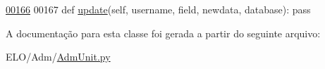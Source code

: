 \begin{DoxyCode}
\hypertarget{classAdm_1_1AdmUnit_1_1IfPersAdm_l00166}{}\hyperlink{classAdm_1_1AdmUnit_1_1IfPersAdm_aafad401f6000d8b27a33af9b461e4f0a}{00166} 
00167     \textcolor{keyword}{def }\hyperlink{classAdm_1_1AdmUnit_1_1IfPersAdm_aafad401f6000d8b27a33af9b461e4f0a}{update}(self, username, field, newdata, database): \textcolor{keyword}{pass}

\end{DoxyCode}


A documentação para esta classe foi gerada a partir do seguinte arquivo\-:\begin{DoxyCompactItemize}
\item 
E\-L\-O/\-Adm/\hyperlink{AdmUnit_8py}{Adm\-Unit.\-py}\end{DoxyCompactItemize}
